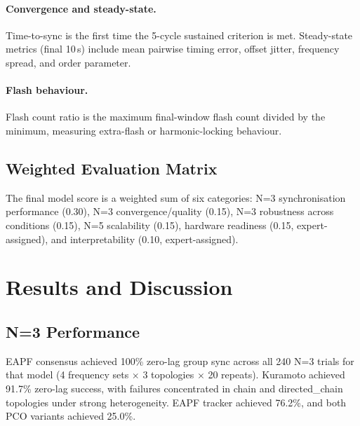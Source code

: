 \documentclass[11pt,a4paper]{article}
\begin{document}
\paragraph{Convergence and steady-state.}
Time-to-sync is the first time the 5-cycle sustained criterion is met.
Steady-state metrics (final 10\,s) include mean pairwise timing error,
offset jitter, frequency spread, and order parameter.

\paragraph{Flash behaviour.}
Flash count ratio is the maximum final-window flash count divided by the
minimum, measuring extra-flash or harmonic-locking behaviour.

\subsection{Weighted Evaluation Matrix}

The final model score is a weighted sum of six categories:
N=3 synchronisation performance (0.30), N=3 convergence/quality (0.15),
N=3 robustness across conditions (0.15), N=5 scalability (0.15),
hardware readiness (0.15, expert-assigned), and interpretability (0.10,
expert-assigned).

\FloatBarrier

\section{Results and Discussion}

\subsection{N=3 Performance}

EAPF consensus achieved 100\% zero-lag group sync across all 240 N=3 trials
for that model (4 frequency sets $\times$ 3 topologies $\times$ 20 repeats).
Kuramoto achieved 91.7\% zero-lag success, with failures concentrated in
chain and directed\_chain topologies under strong heterogeneity.  EAPF
tracker achieved 76.2\%, and both PCO variants achieved 25.0\%.
\end{document}
